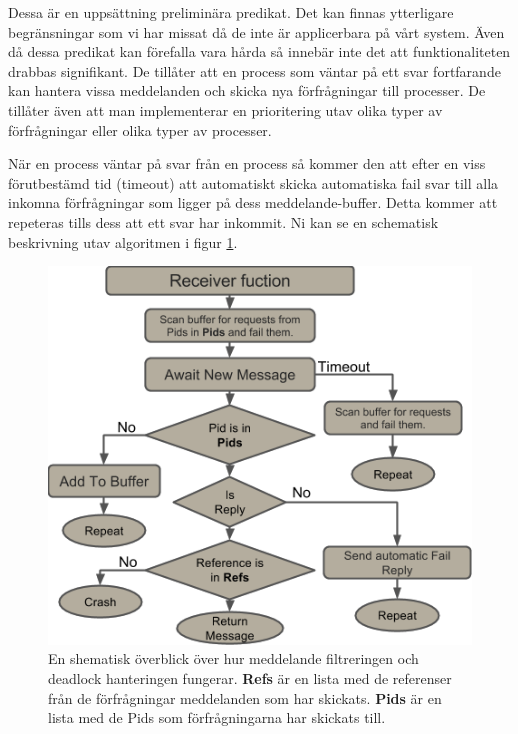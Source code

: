 Dessa är en uppsättning preliminära predikat. Det kan finnas ytterligare begränsningar som vi har missat då de inte är applicerbara på vårt system. Även då dessa predikat kan förefalla vara hårda så innebär inte det att funktionaliteten drabbas signifikant. De tillåter att en process som väntar på ett svar fortfarande kan hantera vissa meddelanden och skicka nya förfrågningar till processer. De tillåter även att man implementerar en prioritering utav olika typer av förfrågningar eller olika typer av processer.

När en process väntar på svar från en process så kommer den att efter en viss förutbestämd tid (timeout) att automatiskt skicka automatiska fail svar till alla inkomna förfrågningar som ligger på dess meddelande-buffer. Detta kommer att repeteras tills dess att ett svar har inkommit. Ni kan se en schematisk beskrivning utav algoritmen i figur \ref{fig:receiver}.

\begin{figure}
\includegraphics[scale=0.8]{Figures/receiver.png}
\caption{En shematisk överblick över hur meddelande filtreringen och deadlock hanteringen fungerar. \textbf{Refs} är en lista med de referenser från de förfrågningar meddelanden som har skickats.  \textbf{Pids} är en lista med de Pids som förfrågningarna har skickats till.}
\label{fig:receiver}
\end{figure}

